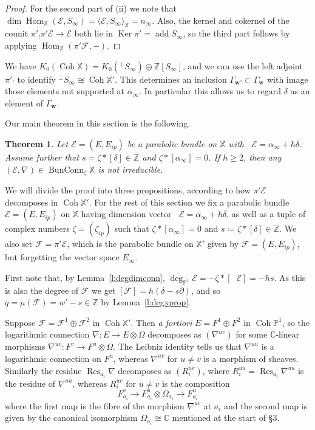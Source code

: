 \documentclass[12pt,a4paper]{amsart}
\theoremstyle{plain}
\newtheorem{thm}{Theorem}[section]
\newcommand{\C}{\mathbb C}
\newcommand{\Z}{\mathbb Z}
\newcommand{\PP}{\mathbb P}
\DeclareMathOperator{\Coh}{Coh}
\DeclareMathOperator{\add}{add}
\DeclareMathOperator{\Hom}{Hom}
\DeclareMathOperator{\Ker}{Ker}
\DeclareMathOperator{\Res}{Res}
\DeclareMathOperator{\BunConn}{BunConn}
\DeclareMathOperator{\dimv}{\underline\dim}
\newcommand{\F}{\mathcal F}
\newcommand{\E}{\mathcal E}
\newcommand{\XX}{\mathbb X}
\newcommand{\bw}{\mathbf w}
\begin{document}
\begin{proof}
For the second part of (ii) we note that $\dim\Hom_\XX(\E,S_\infty)=\langle\E,S_\infty\rangle_\XX=n_\infty$. Also, the kernel and cokernel of the counit $\pi'_!\pi'\E\to\E$ both lie in $\Ker\pi'=\add S_\infty$, so the third part follows by applying $\Hom_\XX(\pi'\F,-)$.
\end{proof}

We have $K_0(\Coh\XX)=K_0({}^\perp S_\infty)\oplus\Z[S_\infty]$, and we can use the left adjoint $\pi'_!$ to identify ${}^\perp S_\infty\cong\Coh\XX'$. This determines an inclusion $\Gamma_{\bw'}\subset\Gamma_\bw$ with image those elements not supported at $\alpha_\infty$. In particular this allows us to regard $\delta$ as an element of $\Gamma_\bw$.

Our main theorem in this section is the following.

\begin{thm}
\label{t:exttubular}
Let $\E=(E,E_{ip})$ be a parabolic bundle on $\XX$ with $\dimv\E=\alpha_\infty+h\delta$. Assume further that $s=\zeta\ast[\delta]\in\Z$ and $\zeta\ast[\alpha_\infty]=0$. If $h\geq2$, then any $(\E,\nabla)\in\BunConn_\zeta\XX$ is not irreducible.
\end{thm}

We will divide the proof into three propositions, according to how $\pi'\E$ decomposes in $\Coh\XX'$. For the rest of this section we fix a parabolic bundle $\E=(E,E_{ip})$ on $\XX$ having dimension vector $\dimv\E=\alpha_\infty+h\delta$, as well as a tuple of complex numbers $\zeta=(\zeta_{ip})$ such that $\zeta\ast[\alpha_\infty]=0$ and $s\coloneqq\zeta\ast[\delta]\in\Z$. We also set $\F=\pi'\E$, which is the parabolic bundle on $\XX'$ given by $\F=(E,E_{ip})$, but forgetting the vector space $E_\infty$.

First note that, by Lemma~\ref{l:degdimconn}, $\deg_{\PP^1}\E=-\zeta\ast[\dimv\E]=-hs$. As this is also the degree of $\F$ we get $[\F]=h(\delta-s\partial)$, and so $q=\mu(\F)=w'-s\in\Z$ by Lemma~\ref{l:degxprop}.

Suppose $\F=\F^1\oplus\F^2$ in $\Coh\XX'$. Then \textit{a fortiori} $E=F^1\oplus F^2$ in $\Coh\PP^1$, so the logarithmic connection $\nabla\colon E\to E\otimes\Omega$ decomposes as $(\nabla^{uv})$ for some $\C$-linear morphisms $\nabla^{uv}\colon F^v\to F^u\otimes\Omega$. The Leibniz identity tells us that $\nabla^{uu}$ is a logarithmic connection on $F^u$, whereas $\nabla^{uv}$ for $u\neq v$ is a morphism of sheaves. Similarly the residue $\Res_{a_i}\nabla$ decomposes as $(R_i^{uv})$, where $R_i^{uu}=\Res_{a_i}\nabla^{uu}$ is the residue of $\nabla^{uu}$, whereas $R_i^{uv}$ for $u\neq v$ is the composition
\[
F^v_{a_i}\to F^u_{a_i} \otimes \Omega_{a_i} \to F^u_{a_i}
\]
where the first map is the fibre of the morphism $\nabla^{uv}$ at $a_i$ and the second map is given by the canonical isomorphism $\Omega_{a_i} \cong \C$ mentioned at the start of \S3.
\end{document}
